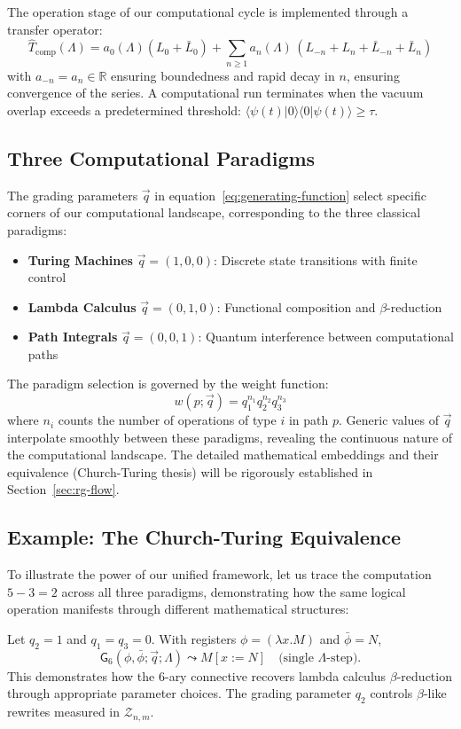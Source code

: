 The operation stage of our computational cycle is implemented through a transfer operator:
\[
\hat{T}_{\text{comp}}(\Lambda)=a_0(\Lambda)(L_0+\bar{L}_0)+\sum_{n\ge1}a_n(\Lambda)\,(L_{-n}+L_n+\bar{L}_{-n}+\bar{L}_n)
\]
with $a_{-n}=a_n\in\mathbb{R}$ ensuring boundedness and rapid decay in $n$, ensuring convergence of the series. A computational run terminates when the vacuum overlap exceeds a predetermined threshold: $\langle\psi(t)|0\rangle\langle 0|\psi(t)\rangle\ge\tau$.

\subsection{Three Computational Paradigms}

The grading parameters $\vec{q}$ in equation~\eqref{eq:generating-function} select specific corners of our computational landscape, corresponding to the three classical paradigms:
\begin{itemize}
\item \textbf{Turing Machines} $\vec{q} = (1,0,0)$: Discrete state transitions with finite control
\item \textbf{Lambda Calculus} $\vec{q} = (0,1,0)$: Functional composition and $\beta$-reduction  
\item \textbf{Path Integrals} $\vec{q} = (0,0,1)$: Quantum interference between computational paths
\end{itemize}

The paradigm selection is governed by the weight function:
\[
w(p;\vec{q}) = q_1^{n_1} q_2^{n_2} q_3^{n_3}
\]
where $n_i$ counts the number of operations of type $i$ in path $p$. Generic values of $\vec{q}$ interpolate smoothly between these paradigms, revealing the continuous nature of the computational landscape. The detailed mathematical embeddings and their equivalence (Church-Turing thesis) will be rigorously established in Section~\ref{sec:rg-flow}.

\subsection{Example: The Church-Turing Equivalence}

To illustrate the power of our unified framework, let us trace the computation $5-3=2$ across all three paradigms, demonstrating how the same logical operation manifests through different mathematical structures:

\begin{example}
\label{ex:concrete-reduction}
Let $q_2=1$ and $q_1=q_3=0$. With registers $\phi=(\lambda x.M)$ and $\bar{\phi}=N$,
\[
\mathsf{G}_6(\phi,\bar{\phi};\vec{q};\Lambda) \leadsto M[x:=N] \quad \text{(single $\Lambda$-step)}.
\]
This demonstrates how the 6-ary connective recovers lambda calculus $\beta$-reduction through appropriate parameter choices. The grading parameter $q_2$ controls $\beta$-like rewrites measured in $\mathcal{Z}_{n,m}$.
\end{example}

